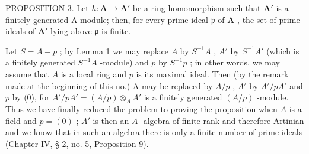 PROPOSITION 3. Let \(h: \mathbf{A} \to \mathbf{A}'\) be a ring homomorphism such that \(\mathbf{A}'\) is a finitely generated A-module; then, for every prime ideal \(\mathfrak{p}\) of \(\mathbf{A}\) , the set of prime ideals of \(\mathbf{A}'\) lying above \(\mathfrak{p}\) is finite.

Let \(S = A - p\) ; by Lemma 1 we may replace \(A\) by \(S^{-1}A\) , \(A'\) by \(S^{-1}A'\) (which is a finitely generated \(S^{-1}A\) -module) and \(p\) by \(S^{-1}p\) ; in other words, we may assume that \(A\) is a local ring and \(p\) is its maximal ideal. Then (by the remark made at the beginning of this no.) A may be replaced by \(A/p\) , \(A'\) by \(A'/pA'\) and \(p\) by (0), for \(A'/pA' = (A/p) \otimes_A A'\) is a finitely generated \((A/p)\) -module. Thus we have finally reduced the problem to proving the proposition when \(A\) is a field and \(p = (0)\) ; \(A'\) is then an \(A\) -algebra of finite rank and therefore Artinian and we know that in such an algebra there is only a finite number of prime ideals (Chapter IV, § 2, no. 5, Proposition 9).

